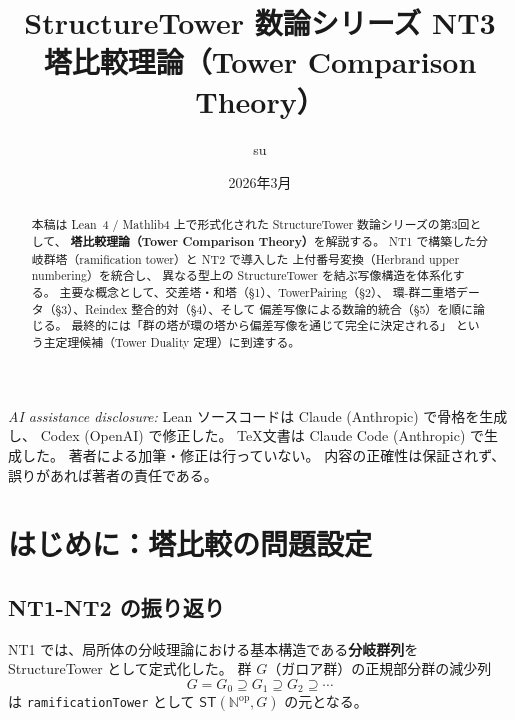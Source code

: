 \documentclass[a4paper,11pt]{ltjsarticle}
\theoremstyle{definition}
\theoremstyle{plain}
\theoremstyle{remark}
\newcommand{\ST}{\mathsf{ST}}
\newcommand{\OD}{\mathbb{N}^{\mathrm{op}}}
\begin{document}

\title{%
  \textbf{StructureTower 数論シリーズ NT3}\\[0.3em]
  \large 塔比較理論（Tower Comparison Theory）}
\author{su}
\date{2026年3月}
\maketitle

\begin{center}
\small
\textit{AI assistance disclosure:}
Lean ソースコードは Claude (Anthropic) で骨格を生成し、
Codex (OpenAI) で修正した。
\TeX 文書は Claude Code (Anthropic) で生成した。
著者による加筆・修正は行っていない。
内容の正確性は保証されず、誤りがあれば著者の責任である。
\end{center}

\begin{abstract}
本稿は Lean~4 / Mathlib4 上で形式化された StructureTower 数論シリーズの第3回として、
\textbf{塔比較理論（Tower Comparison Theory）}を解説する。
NT1 で構築した分岐群塔（ramification tower）と NT2 で導入した
上付番号変換（Herbrand upper numbering）を統合し、
異なる型上の StructureTower を結ぶ写像構造を体系化する。
主要な概念として、交差塔・和塔（§1）、TowerPairing（§2）、
環-群二重塔データ（§3）、Reindex 整合的対（§4）、そして
偏差写像による数論的統合（§5）を順に論じる。
最終的には「群の塔が環の塔から偏差写像を通じて完全に決定される」
という主定理候補（Tower Duality 定理）に到達する。
\end{abstract}

\tableofcontents
\newpage

\section{はじめに：塔比較の問題設定}

\subsection{NT1-NT2 の振り返り}

NT1 では、局所体の分岐理論における基本構造である\textbf{分岐群列}を
StructureTower として定式化した。
群 $G$（ガロア群）の正規部分群の減少列
\[
G = G_0 \supseteq G_1 \supseteq G_2 \supseteq \cdots
\]
は \texttt{ramificationTower} として \(\ST(\OD, G)\) の元となる。
\end{document}
